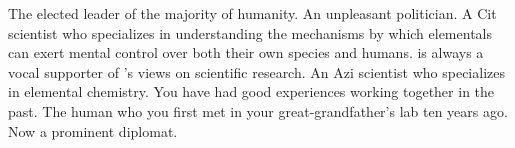 \documentclass[char]{elementals}
\begin{document}
\begin{contacts}
  \contact{\cLeader{}} The elected leader of the majority of humanity.
	\contact{\cDema{}} An unpleasant politician.
	\contact{\cMS{}} A Cit scientist who specializes in understanding the mechanisms by which elementals can exert mental control over both their own species and humans. \cMS{\They} is always a vocal supporter of \cDema{}'s views on scientific research.
	\contact{\cScientist{}} An Azi scientist who specializes in elemental chemistry. You have had good experiences working together in the past.
  \contact{\cAvatar{}} The human who you first met in your great-grandfather's lab ten years ago. Now a prominent diplomat.
\end{contacts}
\end{document}
